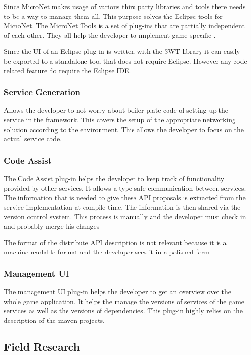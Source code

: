 Since MicroNet makes usage of various thirs party libraries and tools there
needs to be a way to manage them all. This purpose solves the Eclipse tools for
MicroNet. The MicroNet Tools is a set of plug-ins that are partially independent
of each other. They all help the developer to implement game specific \mss{}.

Since the UI of an Eclipse plug-in is written with the SWT library it can easily
be exported to a standalone tool that does not require Eclipse. However any code
related feature do require the Eclipse IDE.

\subsubsection{Service Generation}

Allows the developer to not worry about boiler plate code of setting up the
service in the framework. This covers the setup of the appropriate networking
solution according to the environment. This allows the developer to focus on the
actual service code.

\subsubsection{Code Assist}

The Code Assist plug-in helps the developer to keep track of functionality
provided by other services. It allows a type-safe communication between
services. The information that is needed to give these API proposals is
extracted from the service implementation at compile time. The information is
then shared via the version control system. This process is manually and the
developer must check in and probably merge his changes. 

The format of the distribute API description is not relevant because it is a
machine-readable format and the developer sees it in a polished form.

\subsubsection{Management UI}

The management UI plug-in helps the developer to get an overview over the whole
game application. It helps the manage the versions of services of the game
services as well as the versions of dependencies. This plug-in highly relies on
the description of the maven projects.

\subsection{Field Research}

